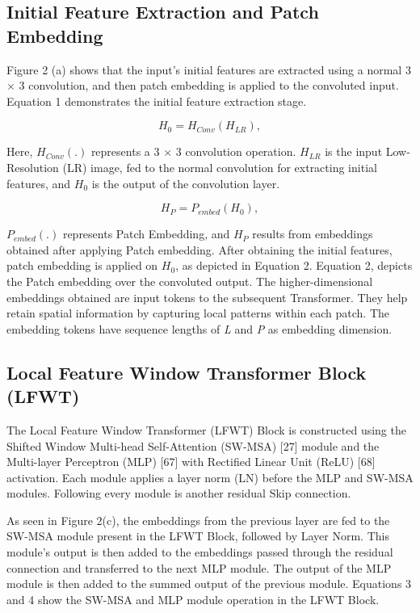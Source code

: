 \documentclass[twocolumn]{svjour3}          %
\begin{document}
\subsection{Initial Feature Extraction and Patch Embedding}
Figure 2 (a) shows that the input's initial features are extracted using a normal 3 × 3 convolution, and then patch embedding is applied to the convoluted input. Equation 1 demonstrates the initial feature extraction stage. 

\begin{equation}
{H_{0}}= {H_{Conv}}({H_{LR}}),
\end{equation}

Here, ${H_{Conv}}$$(.)$ represents a 3 $\times$ 3 convolution operation. ${H_{LR}}$ is the input Low-Resolution (LR) image, fed to the normal convolution for extracting initial features, and ${H_{0}}$ is the output of the convolution layer. 


\begin{equation}
{H_{P}}= {P_{embed}}({H_{0}}),
\end{equation}

${P_{embed}}$$(.)$ represents Patch Embedding, and ${H_{P}}$ results from embeddings obtained after applying Patch embedding. After obtaining the initial features, patch embedding is applied on ${H_{0}}$, as depicted in Equation 2. Equation 2, depicts the Patch embedding over the convoluted output. The higher-dimensional embeddings obtained are input tokens to the subsequent Transformer. They help retain spatial information by capturing local patterns within each patch. The embedding tokens have sequence lengths of \textit{L} and \textit{P} as embedding dimension. 

\subsection{Local Feature Window Transformer Block (LFWT)}
The Local Feature Window Transformer (LFWT) Block is constructed using the Shifted Window Multi-head Self-Attention (SW-MSA) [27] module and the Multi-layer Perceptron (MLP) [67] with Rectified Linear Unit (ReLU) [68] activation. Each module applies a layer norm (LN) before the MLP and SW-MSA modules. Following every module is another residual Skip connection.

As seen in Figure 2(c), the embeddings from the previous layer are fed to the SW-MSA module present in the LFWT Block, followed by Layer Norm. This module's output is then added to the embeddings passed through the residual connection and transferred to the next MLP module. The output of the MLP module is then added to the summed output of the previous module. Equations 3 and 4 show the SW-MSA and MLP module operation in the LFWT Block.
\end{document}
